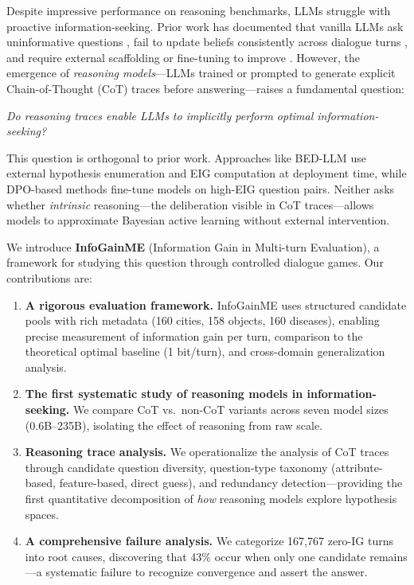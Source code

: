 \documentclass[11pt]{article}
\begin{document}
Despite impressive performance on reasoning benchmarks, LLMs struggle with proactive information-seeking. Prior work has documented that vanilla LLMs ask uninformative questions \citep{bertolazzi2023lets}, fail to update beliefs consistently across dialogue turns \citep{choudhury2025bedllm}, and require external scaffolding or fine-tuning to improve \citep{mazzaccara2024learning,hu2024uncertainty}. However, the emergence of \emph{reasoning models}---LLMs trained or prompted to generate explicit Chain-of-Thought (CoT) traces before answering---raises a fundamental question:

\begin{center}
\emph{Do reasoning traces enable LLMs to implicitly perform optimal information-seeking?}
\end{center}

This question is orthogonal to prior work. Approaches like BED-LLM \citep{choudhury2025bedllm} use external hypothesis enumeration and EIG computation at deployment time, while DPO-based methods \citep{mazzaccara2024learning} fine-tune models on high-EIG question pairs. Neither asks whether \emph{intrinsic} reasoning---the deliberation visible in CoT traces---allows models to approximate Bayesian active learning without external intervention.

We introduce \textbf{InfoGainME} (Information Gain in Multi-turn Evaluation), a framework for studying this question through controlled dialogue games. Our contributions are:

\begin{enumerate}
    \item \textbf{A rigorous evaluation framework.} InfoGainME uses structured candidate pools with rich metadata (160 cities, 158 objects, 160 diseases), enabling precise measurement of information gain per turn, comparison to the theoretical optimal baseline (1 bit/turn), and cross-domain generalization analysis.
    
    \item \textbf{The first systematic study of reasoning models in information-seeking.} We compare CoT vs.\ non-CoT variants across seven model sizes (0.6B--235B), isolating the effect of reasoning from raw scale.
    
    \item \textbf{Reasoning trace analysis.} We operationalize the analysis of CoT traces through candidate question diversity, question-type taxonomy (attribute-based, feature-based, direct guess), and redundancy detection---providing the first quantitative decomposition of \emph{how} reasoning models explore hypothesis spaces.
    
    \item \textbf{A comprehensive failure analysis.} We categorize 167,767 zero-IG turns into root causes, discovering that 43\% occur when only one candidate remains---a systematic failure to recognize convergence and assert the answer.
\end{enumerate}
\end{document}
